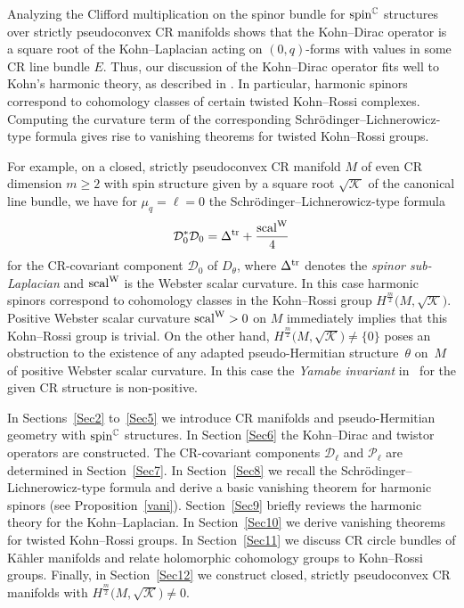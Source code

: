 \documentclass[pdftex]{sigma}
\numberwithin{equation}{section}
\newcommand{\CC}{\mathbb{C}}
\begin{document}
Analyzing the Clifford multiplication on the spinor bundle for ${\rm spin}^\CC$ structures over strictly pseudoconvex CR manifolds
shows that the Kohn--Dirac operator is a square root of the Kohn--Laplacian acting on $(0,q)$-forms with values in some CR line bundle $E$.
Thus, our discussion of the Kohn--Dirac operator fits well to Kohn's harmonic theory, as described in \cite{Tan}.
In particular, harmonic spinors correspond to cohomology classes of certain twisted Kohn--Rossi complexes. Computing the curvature term of
the corresponding Schr\"odinger--Lichnerowicz-type formula gives rise to vanishing theorems for twisted Kohn--Rossi groups.

For example,
on a closed, strictly pseudoconvex CR manifold $M$ of even CR dimension $m\geq 2$ with spin structure given by a square root $\sqrt{\mathcal{K}}$
of the canonical line bundle,
we have for $\mu_q=\ell=0$ the Schr\"odinger--Lichnerowicz-type formula
\[
\mathcal{D}_0^*\mathcal{D}_0 = \Delta^{\rm tr} + \frac{{\rm scal}^{\rm W}}{4}
\]
for the CR-covariant component $\mathcal{D}_0$ of $D_\theta$,
where $\Delta^{\rm tr}$ denotes the {\em spinor sub-Laplacian} and ${\rm scal}^{\rm W}$ is the Webster scalar curvature.
In this case harmonic spinors correspond to cohomology classes in the
Kohn--Rossi group $H^{\frac{m}{2}}\big(M,\sqrt{\mathcal{K}}\big)$.
Positive Webster scalar curvature ${\rm scal}^{\rm W}>0$ on $M$ immediately implies that this Kohn--Rossi group is trivial.
On the other hand, \mbox{$H^{\frac{m}{2}}\big(M,\sqrt{\mathcal{K}}\big)\neq\{0\}$} poses an obstruction to the existence of any
adapted pseudo-Hermitian structure~$\theta$ on~$M$ of positive Webster scalar curvature.
In this case the {\em Yamabe invariant} in~\cite{JL} for the given CR structure is non-positive.

In Sections~\ref{Sec2} to~\ref{Sec5} we introduce CR manifolds and pseudo-Hermitian geometry with ${\rm spin}^\CC$ structures.
In Section \ref{Sec6} the Kohn--Dirac and twistor operators are constructed. The CR-covariant
components $\mathcal{D}_\ell$ and $\mathcal{P}_\ell$ are determined in Section~\ref{Sec7}. In Section~\ref{Sec8} we recall
the Schr\"odinger--Lichnerowicz-type formula and derive a basic vanishing theorem for harmonic spi\-nors (see Proposition~\ref{vani}).
Section~\ref{Sec9} briefly reviews the harmonic theory for the Kohn--Laplacian. In Section~\ref{Sec10} we derive
 vanishing theorems for twisted Kohn--Rossi groups. In Section~\ref{Sec11} we discuss CR circle bundles of K\"ahler manifolds and
relate holomorphic cohomology groups to Kohn--Rossi groups. Finally, in Section~\ref{Sec12} we construct closed, strictly pseudoconvex CR mani\-folds
with $H^{\frac{m}{2}}\big(M,\sqrt{\mathcal{K}}\big)\neq 0$.
\end{document}
